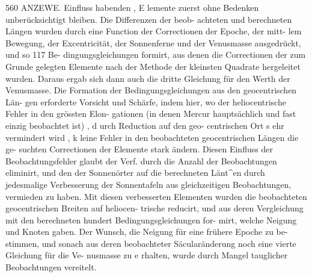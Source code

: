 \documentclass[12pt,a4paper]{article}
\begin{document}
\newpage
560 ANZEWE.\newline
Einfluss habenden , E lemente zuerst ohne Bedenken unberücksichtigt bleiben. Die Differenzen der beob-\newline
achteten und berechneten Längen wurden durch eine Function der Correctionen der Epoche, der mitt-\newline
lem Bewegung, der Excentricität, der Sonnenferne und der Venusmasse ausgedrückt, und so 117 Be-\newline
dingungsgleichungen formirt, aus denen die Correctionen der zum Grunde gelegten Elemente nach der\newline
Methode der kleinsten Quadrate hergeleitet wurden. Daraus ergab sich dann auch die dritte Gleichung\newline
für den Werth der Venusmasse. Die Formation der Bedingungsgleichungen aus den geocentrischen Län-\newline
gen erforderte Vorsicht und Schärfe, indem hier, wo der heliocentrische Fehler in den grössten Elon-\newline
gationen (in denen Mercur hauptsächlich und fast einzig beobachtet ist) , d urch Reduction auf den geo-\newline
centrischen Ort s ehr vermindert wird , k leine Fehler in den beobachteten geocentrischen Längen die ge-\newline
suchten Correctionen der Elemente stark ändern. Diesen Einfluss der Beobachtungsfehler glaubt der\newline
Verf. durch die Anzahl der Beobachtungen eliminirt, und den der Sonnenörter auf die berechneten\newline
Länt\^{}en durch jedesmalige Verbesserung der Sonnentafeln aus gleichzeitigen Beobachtungen, vermieden\newline
zu haben.\newline
Mit diesen verbesserten Elementen wurden die beobachteten geocentrischen Breiten auf heliocen-\newline
trische reducirt, und aus deren Vergleichung mit den berechneten hundert Bedingungsgleichungen for-\newline
mirt, welche Neigung und Knoten gaben. Der Wunsch, die Neigung für eine frühere Epoche zu be-\newline
stimmen, und sonach aus deren beobachteter Säcularänderung noch eine vierte Gleichung für die Ve-\newline
nusmasse zu e rhalten, wurde durch Mangel tauglicher Beobachtungen vereitelt.\newline
\end{document}

